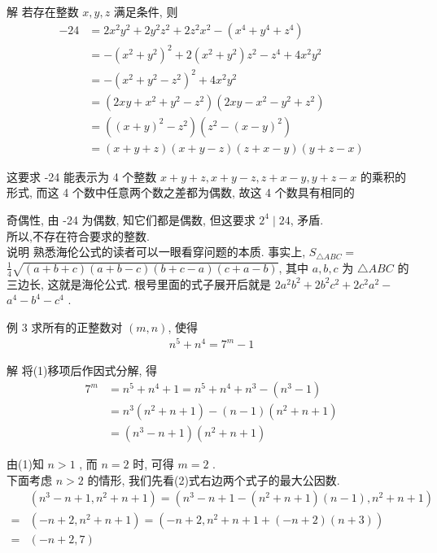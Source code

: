 	解 若存在整数 $x ,  y ,  z$ 满足条件, 则\begin{align}
		-24 & =2 x^{2} y^{2}+2 y^{2} z^{2}+2 z^{2} x^{2}-\left(x^{4}+y^{4}+z^{4}\right)          \\
		    & =-\left(x^{2}+y^{2}\right)^{2}+2\left(x^{2}+y^{2}\right) z^{2}-z^{4}+4 x^{2} y^{2} \\
		    & =-\left(x^{2}+y^{2}-z^{2}\right)^{2}+4 x^{2} y^{2}                                 \\
		    & =\left(2 x y+x^{2}+y^{2}-z^{2}\right)\left(2 x y-x^{2}-y^{2}+z^{2}\right)          \\
		    & =\left((x+y)^{2}-z^{2}\right)\left(z^{2}-(x-y)^{2}\right)                          \\
		    & =(x+y+z)(x+y-z)(z+x-y)(y+z-x)
	\end{align}

	这要求 -24 能表示为 4 个整数 $x+y+z, x+y-z, z+x-y, y+z-x$ 的乘积的形式, 而这 4 个数中任意两个数之差都为偶数, 故这 4 个数具有相同的

	奇偶性, 由 -24 为偶数, 知它们都是偶数, 但这要求 $2^{4} \mid 24$, 矛盾.\\
	所以,不存在符合要求的整数.\\
	说明 熟悉海伦公式的读者可以一眼看穿问题的本质. 事实上, $S_{\triangle A B C}=$ $\frac{1}{4} \sqrt{(a+b+c)(a+b-c)(b+c-a)(c+a-b)}$, 其中 $a ,  b ,  c$ 为 $\triangle A B C$ 的三边长, 这就是海伦公式. 根号里面的式子展开后就是 $2 a^{2} b^{2}+2 b^{2} c^{2}+2 c^{2} a^{2}-$ $a^{4}-b^{4}-c^{4}$ .

	例 3 求所有的正整数对 $(m, n)$, 使得
\begin{align*}
		n^{5}+n^{4}=7^{m}-1
	\end{align*}

	解 将(1)移项后作因式分解, 得\begin{align}
		7^{m} & =n^{5}+n^{4}+1=n^{5}+n^{4}+n^{3}-\left(n^{3}-1\right)    \\
		      & =n^{3}\left(n^{2}+n+1\right)-(n-1)\left(n^{2}+n+1\right) \\
		      & =\left(n^{3}-n+1\right)\left(n^{2}+n+1\right)
	\end{align}

	由(1)知 $n>1$ , 而 $n=2$ 时, 可得 $m=2$ . \\
	下面考虑 $n>2$ 的情形, 我们先看(2)式右边两个式子的最大公因数.\begin{align}
		  & \left(n^{3}-n+1, n^{2}+n+1\right)=\left(n^{3}-n+1-\left(n^{2}+n+1\right)(n-1), n^{2}+n+1\right) \\
		= & \left(-n+2, n^{2}+n+1\right)=\left(-n+2, n^{2}+n+1+(-n+2)(n+3)\right)                           \\
		= & (-n+2,7)
	\end{align}

